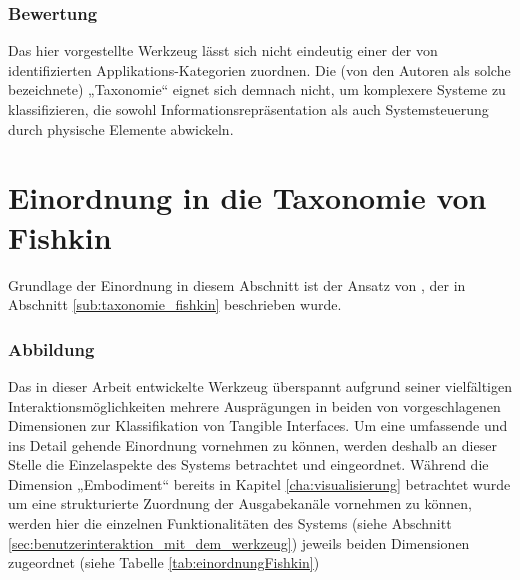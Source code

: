 \subsubsection{Bewertung}

Das hier vorgestellte Werkzeug lässt sich nicht eindeutig einer der von \citet{Klemmer04} identifizierten Applikations-Kategorien zuordnen. Die (von den Autoren als solche bezeichnete) „Taxonomie“ eignet sich demnach nicht, um komplexere Systeme zu klassifizieren, die sowohl Informationsrepräsentation als auch Systemsteuerung durch physische Elemente abwickeln.


\section{Einordnung in die Taxonomie von Fishkin} %
\label{sec:einordnung_in_die_taxonomie_von_fishkin}

Grundlage der Einordnung in diesem Abschnitt ist der Ansatz von \citet{Fishkin04}, der in Abschnitt \ref{sub:taxonomie_fishkin} beschrieben wurde.

\subsubsection{Abbildung}
Das in dieser Arbeit entwickelte Werkzeug überspannt aufgrund seiner vielfältigen Interaktionsmöglichkeiten mehrere Ausprägungen in beiden von \citeauthor{Fishkin04} vorgeschlagenen Dimensionen zur Klassifikation von Tangible Interfaces. Um eine umfassende und ins Detail gehende Einordnung vornehmen zu können, werden deshalb an dieser Stelle die Einzelaspekte des Systems betrachtet und eingeordnet. Während die Dimension „Embodiment“ bereits in Kapitel \ref{cha:visualisierung} betrachtet wurde um eine strukturierte Zuordnung der Ausgabekanäle vornehmen zu können, werden hier die einzelnen Funktionalitäten des Systems (siehe Abschnitt \ref{sec:benutzerinteraktion_mit_dem_werkzeug}) jeweils beiden Dimensionen zugeordnet (siehe Tabelle \ref{tab:einordnungFishkin})

